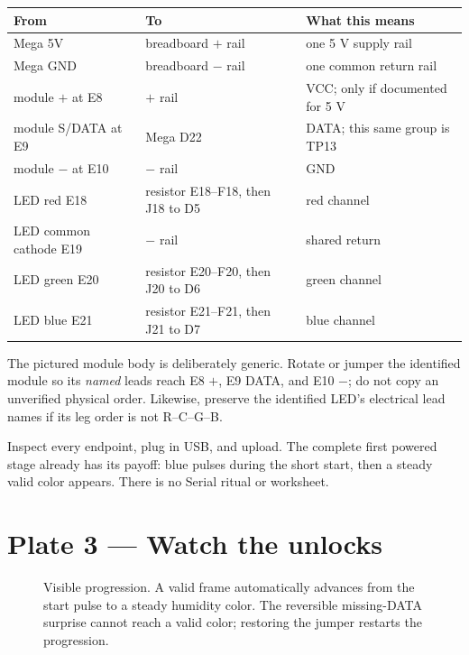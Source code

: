 \documentclass[11pt]{article}
\begin{document}
\begin{tabularx}{\linewidth}{@{}l l X@{}}
\toprule
From & To & What this means\\
\midrule
Mega 5V & breadboard \(+\) rail & one 5 V supply rail\\
Mega GND & breadboard \(-\) rail & one common return rail\\
module \(+\) at E8 & \(+\) rail & VCC; only if documented for 5 V\\
module S/DATA at E9 & Mega D22 & DATA; this same group is TP13\\
module \(-\) at E10 & \(-\) rail & GND\\
LED red E18 & resistor E18--F18, then J18 to D5 & red channel\\
LED common cathode E19 & \(-\) rail & shared return\\
LED green E20 & resistor E20--F20, then J20 to D6 & green channel\\
LED blue E21 & resistor E21--F21, then J21 to D7 & blue channel\\
\bottomrule
\end{tabularx}

The pictured module body is deliberately generic. Rotate or jumper the
identified module so its \emph{named} leads reach E8 \(+\), E9 DATA, and E10
\(-\); do not copy an unverified physical order. Likewise, preserve the
identified LED's electrical lead names if its leg order is not R--C--G--B.

Inspect every endpoint, plug in USB, and upload. The complete first powered
stage already has its payoff: blue pulses during the short start, then a steady
valid color appears. There is no Serial ritual or worksheet.

\section{Plate 3 --- Watch the unlocks}

\begin{figure}[H]
  \centering
  \caption{Visible progression. A valid frame automatically advances from the
  start pulse to a steady humidity color. The reversible missing-DATA surprise
  cannot reach a valid color; restoring the jumper restarts the progression.}
\end{figure}
\end{document}
